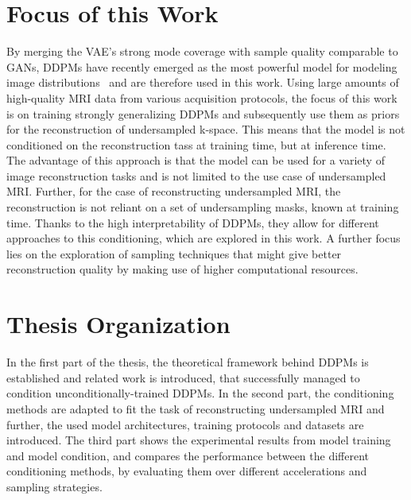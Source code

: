 \section{Focus of this Work}
By merging the VAE's strong mode coverage with sample quality comparable to GANs, DDPMs have recently emerged as the most powerful model for modeling image distributions~\autocite{dhariwal2021diffusion} and are therefore used in this work. Using large amounts of high-quality MRI data from various acquisition protocols, the focus of this work is on training strongly generalizing DDPMs and subsequently use them as priors for the reconstruction of undersampled k-space. This means that the model is not conditioned on the reconstruction tass at training time, but at inference time. The advantage of this approach is that the model can be used for a variety of image reconstruction tasks and is not limited to the use case of undersampled MRI. Further, for the case of reconstructing undersampled MRI, the reconstruction is not reliant on a set of undersampling masks, known at training time. Thanks to the high interpretability of DDPMs, they allow for different approaches to this conditioning, which are explored in this work. A further focus lies on the exploration of sampling techniques that might give better reconstruction quality by making use of higher computational resources.
\section{Thesis Organization}
In the first part of the thesis, the theoretical framework behind DDPMs is established and related work is introduced, that successfully managed to condition unconditionally-trained DDPMs. In the second part, the conditioning methods are adapted to fit the task of reconstructing undersampled MRI and further, the used model architectures, training protocols and datasets are introduced. The third part shows the experimental results from model training and model condition, and compares the performance between the different conditioning methods, by evaluating them over different accelerations and sampling strategies.